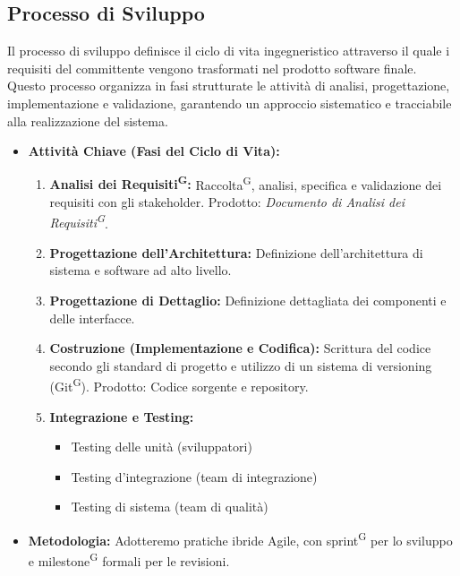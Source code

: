 \documentclass[a4paper, 11pt]{article}
\begin{document}
\subsection{Processo di Sviluppo}
Il processo di sviluppo definisce il ciclo di vita ingegneristico attraverso il quale i requisiti del committente vengono trasformati nel prodotto software finale. 
Questo processo organizza in fasi strutturate le attività di analisi, progettazione, implementazione e validazione, garantendo un approccio sistematico e tracciabile alla realizzazione del sistema.\\

\begin{itemize}
    \item \textbf{Attività Chiave (Fasi del Ciclo di Vita):}
    \begin{enumerate}
        \item \textbf{Analisi dei Requisiti\textsuperscript{G}:} Raccolta\textsuperscript{G}, analisi, specifica e validazione dei requisiti con gli stakeholder. Prodotto: \textit{Documento di Analisi dei Requisiti\textsuperscript{G}}.
        \item \textbf{Progettazione dell'Architettura:} Definizione dell'architettura di sistema e software ad alto livello.
        \item \textbf{Progettazione di Dettaglio:} Definizione dettagliata dei componenti e delle interfacce.
        \item \textbf{Costruzione (Implementazione e Codifica):} Scrittura del codice secondo gli standard di progetto e utilizzo di un sistema di versioning (Git\textsuperscript{G}). Prodotto: Codice sorgente e repository.
        \item \textbf{Integrazione e Testing:}
        \begin{itemize}
            \item Testing delle unità (sviluppatori)
            \item Testing d'integrazione (team di integrazione)
            \item Testing di sistema (team di qualità)
        \end{itemize}
    \end{enumerate}
    \item \textbf{Metodologia:} Adotteremo pratiche ibride Agile, con sprint\textsuperscript{G} per lo sviluppo e milestone\textsuperscript{G} formali per le revisioni.
\end{itemize}
\end{document}
